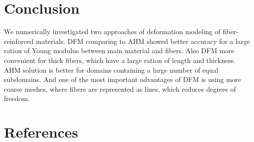 \documentclass[a4paper]{jpconf}
\begin{document}
\section{Conclusion}
We numerically investigated two approaches of deformation modeling of fiber-reinforced materials. DFM comparing to AHM showed better accuracy for a large ration of Young modulus between main material and fibers. Also DFM more convenient for thick fibers, which have a large ration of length and thickness. AHM solution is better for domains containing a large number of equal subdomains. And one of the most important advantages of DFM is using more coarse meshes, where fibers are represented as lines, which reduces degrees of freedom.

\section*{References}
\end{document}
